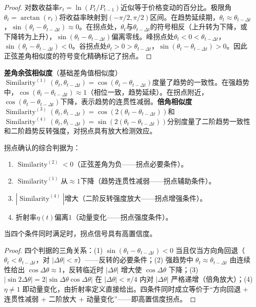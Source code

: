 \begin{proof}
对数收益率$r_t = \ln(P_t/P_{t-1})$近似等于价格变动的百分比。极限角$\theta_t = \arctan(r_t)$将收益率映射到$(-\pi/2, \pi/2)$区间。在趋势延续期，$\theta_t \approx \theta_{t-\Delta t}$，$\sin(\theta_t - \theta_{t-\Delta t}) \approx 0$。在拐点处，$\theta_t$与$\theta_{t-\Delta t}$的符号相反（上升转为下降，或下降转为上升），$\sin(\theta_t - \theta_{t-\Delta t})$偏离零线。峰拐点处$\theta_t < 0 < \theta_{t-\Delta t}$，$\sin(\theta_t - \theta_{t-\Delta t}) < 0$。谷拐点处$\theta_t > 0 > \theta_{t-\Delta t}$，$\sin(\theta_t - \theta_{t-\Delta t}) > 0$。因此正弦差角相似度的符号变化精确标记了拐点。
\end{proof}

\begin{proposition}[趋势相似度与趋势强度确认]\label{prop:trend_similarity_stock}
\textbf{差角余弦相似度}（基础差角值相似度）$\operatorname{Similarity}^{(1)}(\theta_t, \theta_{t-\Delta t}) = \cos(\theta_t - \theta_{t-\Delta t})$度量了趋势的一致性。在强趋势中，$\cos(\theta_t - \theta_{t-\Delta t}) \approx 1$（相位一致，趋势延续）。在拐点附近，$\cos(\theta_t - \theta_{t-\Delta t})$下降，表示趋势的连贯性减弱。\textbf{倍角相似度}$\operatorname{Similarity}^{(3)}(\theta_t, \theta_{t-\Delta t}) = \cos(2(\theta_t - \theta_{t-\Delta t}))$和$\operatorname{Similarity}^{(4)}(\theta_t, \theta_{t-\Delta t}) = \sin(2(\theta_t - \theta_{t-\Delta t}))$分别度量了二阶趋势一致性和二阶趋势反转强度，对拐点具有放大检测效应。

拐点确认的综合判据为：
\begin{enumerate}[label=(\roman*)]
    \item $\operatorname{Similarity}^{(2)} < 0$（正弦差角为负——拐点必要条件）。
    \item $\operatorname{Similarity}^{(1)}$从$\approx 1$下降（趋势连贯性减弱——拐点辅助条件）。
    \item $|\operatorname{Similarity}^{(4)}|$增大（二阶反转强度放大——拐点增强条件）。
    \item 折射率$\eta(t)$偏离$1$（动量变化——拐点强度条件）。
\end{enumerate}
当四个条件同时满足时，拐点信号具有高置信度。
\end{proposition}

\begin{proof}
四个判据的三角关系：(1) $\sin(\theta_t - \theta_{t-\Delta t}) < 0$ 当且仅当方向角回退（$\theta_t < \theta_{t-\Delta t}$，对 $|\Delta\theta| < \pi$）——反转的必要条件；(2) 强趋势中 $\theta_t \approx \theta_{t-\Delta t}$ 由连续性给出 $\cos\Delta\theta \approx 1$，反转临近时 $|\Delta\theta|$ 增大使 $\cos\Delta\theta$ 下降；(3) $|\sin 2\Delta\theta| = 2|\sin\Delta\theta\cos\Delta\theta|$ 在 $|\Delta\theta| < \pi/4$ 内对 $|\Delta\theta|$ 严格递增（倍角放大）；(4) $\eta \neq 1$ 即动量变化，由折射率定义直接给出。四条件同时成立等价于“方向回退 + 连贯性减弱 + 二阶放大 + 动量变化”——即高置信度拐点。
\end{proof}

